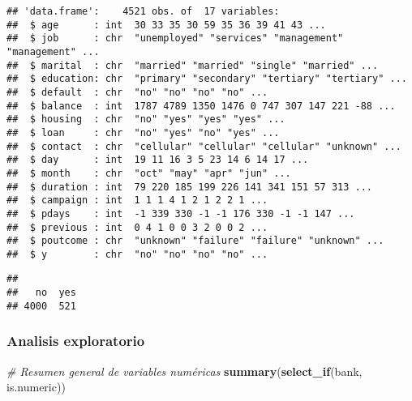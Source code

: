 \documentclass[
]{article}
\newenvironment{Shaded}{\begin{snugshade}}{\end{snugshade}}
\newcommand{\CommentTok}[1]{\textcolor[rgb]{0.56,0.35,0.01}{\textit{#1}}}
\newcommand{\FunctionTok}[1]{\textcolor[rgb]{0.13,0.29,0.53}{\textbf{#1}}}
\newcommand{\NormalTok}[1]{#1}
\newcommand{\SpecialCharTok}[1]{\textcolor[rgb]{0.81,0.36,0.00}{\textbf{#1}}}
\begin{document}
\begin{verbatim}
## 'data.frame':    4521 obs. of  17 variables:
##  $ age      : int  30 33 35 30 59 35 36 39 41 43 ...
##  $ job      : chr  "unemployed" "services" "management" "management" ...
##  $ marital  : chr  "married" "married" "single" "married" ...
##  $ education: chr  "primary" "secondary" "tertiary" "tertiary" ...
##  $ default  : chr  "no" "no" "no" "no" ...
##  $ balance  : int  1787 4789 1350 1476 0 747 307 147 221 -88 ...
##  $ housing  : chr  "no" "yes" "yes" "yes" ...
##  $ loan     : chr  "no" "yes" "no" "yes" ...
##  $ contact  : chr  "cellular" "cellular" "cellular" "unknown" ...
##  $ day      : int  19 11 16 3 5 23 14 6 14 17 ...
##  $ month    : chr  "oct" "may" "apr" "jun" ...
##  $ duration : int  79 220 185 199 226 141 341 151 57 313 ...
##  $ campaign : int  1 1 1 4 1 2 1 2 2 1 ...
##  $ pdays    : int  -1 339 330 -1 -1 176 330 -1 -1 147 ...
##  $ previous : int  0 4 1 0 0 3 2 0 0 2 ...
##  $ poutcome : chr  "unknown" "failure" "failure" "unknown" ...
##  $ y        : chr  "no" "no" "no" "no" ...
\end{verbatim}

\begin{Shaded}
\end{Shaded}

\begin{verbatim}
## 
##   no  yes 
## 4000  521
\end{verbatim}

\subsubsection{Analisis exploratorio}\label{analisis-exploratorio}

\begin{Shaded}
\begin{Highlighting}[]
\CommentTok{\# Resumen general de variables numéricas}
\FunctionTok{summary}\NormalTok{(}\FunctionTok{select\_if}\NormalTok{(bank, is.numeric))}
\end{Highlighting}
\end{Shaded}
\end{document}
